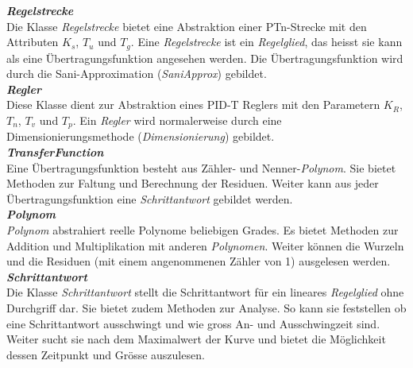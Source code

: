 \textit{\textbf{Regelstrecke}}\\
Die Klasse \textit{Regelstrecke} bietet eine Abstraktion einer PTn-Strecke mit den Attributen $K_s$, $T_u$ und $T_g$. Eine \textit{Regelstrecke} ist ein \textit{Regelglied}, das heisst sie kann als eine Übertragungsfunktion angesehen werden. Die Übertragungsfunktion wird durch die Sani-Approximation (\textit{SaniApprox}) gebildet.\\

\textit{\textbf{Regler}}\\
Diese Klasse dient zur Abstraktion eines PID-T Reglers mit den Parametern $K_R$, $T_n$, $T_v$ und $T_p$. Ein \textit{Regler} wird normalerweise durch eine Dimensionierungsmethode (\textit{Dimensionierung}) gebildet.\\

\textit{\textbf{TransferFunction}}\\
Eine Übertragungsfunktion besteht aus Zähler- und Nenner-\textit{Polynom}. Sie bietet Methoden zur Faltung und Berechnung der Residuen. Weiter kann aus jeder Übertragungsfunktion eine \textit{Schrittantwort} gebildet werden.\\

\textit{\textbf{Polynom}}\\
\textit{Polynom} abstrahiert reelle Polynome beliebigen Grades. Es bietet Methoden zur Addition und Multiplikation mit anderen \textit{Polynomen}. Weiter können die Wurzeln und die Residuen (mit einem angenommenen Zähler von 1) ausgelesen werden. \\
 
\textit{\textbf{Schrittantwort}}\\
Die Klasse \textit{Schrittantwort} stellt die Schrittantwort für ein lineares \textit{Regelglied} ohne Durchgriff dar. Sie bietet zudem Methoden zur Analyse. So kann sie feststellen ob eine Schrittantwort ausschwingt und wie gross An- und Ausschwingzeit sind. Weiter sucht sie nach dem Maximalwert der Kurve und bietet die Möglichkeit dessen Zeitpunkt und Grösse auszulesen.

